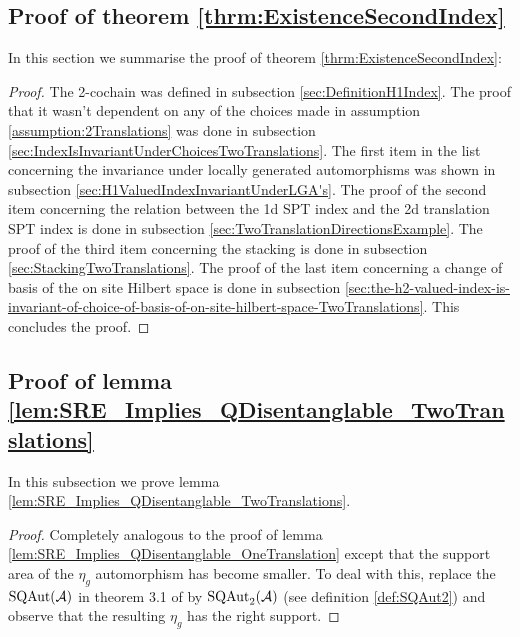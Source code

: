 \documentclass[11pt,a4paper,twoside]{article}
\numberwithin{equation}{section}
\begin{document}
\subsection{Proof of theorem \ref{thrm:ExistenceSecondIndex}}\label{sec:ProofOf:thrm:ExistenceSecondIndex}
In this section we summarise the proof of theorem \ref{thrm:ExistenceSecondIndex}:
\begin{proof}
	The 2-cochain was defined in subsection \ref{sec:DefinitionH1Index}. The proof that it wasn't dependent on any of the choices made in assumption \ref{assumption:2Translations} was done in subsection \ref{sec:IndexIsInvariantUnderChoicesTwoTranslations}. The first item in the list concerning the invariance under locally generated automorphisms was shown in subsection \ref{sec:H1ValuedIndexInvariantUnderLGA's}. The proof of the second item concerning the relation between the 1d SPT index and the 2d translation SPT index is done in subsection \ref{sec:TwoTranslationDirectionsExample}. The proof of the third item concerning the stacking is done in subsection \ref{sec:StackingTwoTranslations}. The proof of the last item concerning a change of basis of the on site Hilbert space is done in subsection \ref{sec:the-h2-valued-index-is-invariant-of-choice-of-basis-of-on-site-hilbert-space-TwoTranslations}. This concludes the proof.
\end{proof}
\subsection{Proof of lemma \ref{lem:SRE_Implies_QDisentanglable_TwoTranslations}}\label{sec:ProofOfMainResult2}
In this subsection we prove lemma \ref{lem:SRE_Implies_QDisentanglable_TwoTranslations}.
\begin{proof}
	Completely analogous to the proof of lemma \ref{lem:SRE_Implies_QDisentanglable_OneTranslation} except that the support area of the $\eta_g$ automorphism has become smaller. To deal with this, replace the $\textrm{SQAut}(\AA)$ in theorem 3.1 of \cite{ogata2021h3gmathbb} by $\textrm{SQAut}_2(\AA)$ (see definition \ref{def:SQAut2}) and observe that the resulting $\eta_g$ has the right support.
\end{proof}


\end{document}
